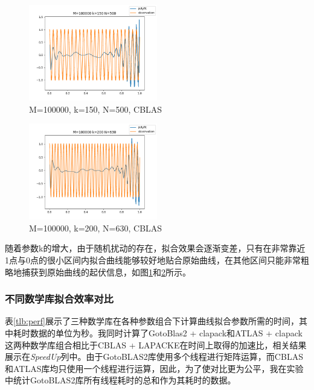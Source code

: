 \documentclass[a4paper]{article}
\begin{document}
\begin{figure}[tbp]
  \centering
  \includegraphics[width=0.5\textwidth]{figures/lapack/figure13_M_100000_k_150_N_500.png}
  \caption{M=100000, k=150, N=500, CBLAS}
  \label{fig:exp6}
\end{figure}

\begin{figure}[tbp]
  \centering
  \includegraphics[width=0.5\textwidth]{figures/lapack/figure15_M_100000_k_200_N_630.png}
  \caption{M=100000, k=200, N=630, CBLAS}
  \label{fig:exp7}
\end{figure}


随着参数k的增大，由于随机扰动的存在，拟合效果会逐渐变差，只有在非常靠近1点与0点的很小区间内拟合曲线能够较好地贴合原始曲线，在其他区间只能非常粗略地捕获到原始曲线的起伏信息，如图\ref{fig:exp6}和\ref{fig:exp7}所示。






\subsubsection{不同数学库拟合效率对比}
表\ref{tlb:perf}展示了三种数学库在各种参数组合下计算曲线拟合参数所需的时间，其中耗时数据的单位为秒。我同时计算了GotoBlas2 + clapack和ATLAS + clapack这两种数学库组合相比于CBLAS + LAPACKE在时间上取得的加速比，相关结果展示在\emph{SpeedUp}列中。由于GotoBLAS2库使用多个线程进行矩阵运算，而CBLAS和ATLAS库均只使用一个线程进行运算，因此，为了使对比更为公平，我在实验中统计GotoBLAS2库所有线程耗时的总和作为其耗时的数据。
\end{document}
